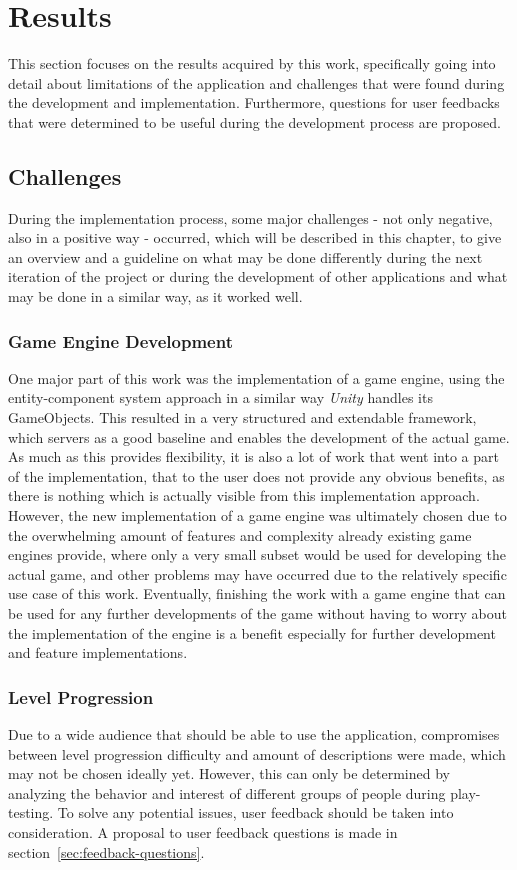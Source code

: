 \chapter{Results}\label{ch:results}
This section focuses on the results acquired by this work, specifically going into detail about
limitations of the application and challenges that were found during the development and implementation.
Furthermore, questions for user feedbacks that were determined to be useful during the development process are proposed.
\section{Challenges}\label{sec:challenges}
During the implementation process, some major challenges - not only negative, also in a positive way - occurred, which will be described in this chapter, to give an
overview and a guideline on what may be done differently during the next iteration of the project or during the development of other
applications and what may be done in a similar way, as it worked well.
\subsection{Game Engine Development}\label{subsec:entity-component-system-challenges}
One major part of this work was the implementation of a game engine, using the entity-component system approach in a similar way
\textit{Unity} handles its GameObjects.
This resulted in a very structured and extendable framework, which servers as a good baseline and enables the development of the actual game.
As much as this provides flexibility, it is also a lot of work that went into a part of the implementation, that to the user
does not provide any obvious benefits, as there is nothing which is actually visible from this implementation approach.
However, the new implementation of a game engine was ultimately chosen due to the overwhelming amount of features and complexity
already existing game engines provide, where only a very small subset would be used for developing the actual game, and other problems
may have occurred due to the relatively specific use case of this work.
Eventually, finishing the work with a game engine that can be used for any further developments of the game without having to worry
about the implementation of the engine is a benefit especially for further development and feature implementations.
\subsection{Level Progression}\label{subsec:level-progression}
Due to a wide audience that should be able to use the application, compromises between level progression difficulty and
amount of descriptions were made, which may not be chosen ideally yet.
However, this can only be determined by analyzing the behavior and interest of different groups of people during play-testing.
To solve any potential issues, user feedback should be taken into consideration.
A proposal to user feedback questions is made in section~\ref{sec:feedback-questions}.
